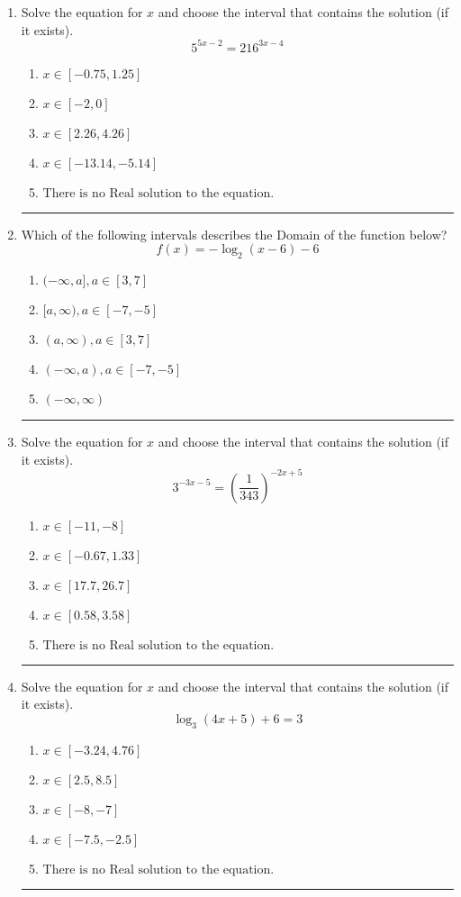 \documentclass[14pt]{extbook}
\newcommand{\litem}[1]{\item#1\hspace*{-1cm}\rule{\textwidth}{0.4pt}}
\begin{document}
\begin{enumerate}
{\begin{enumerate}[label=\Alph*.]
\end{enumerate} }
\litem{
Solve the equation for $x$ and choose the interval that contains the solution (if it exists).\[ 5^{5x-2} = 216^{3x-4} \]\begin{enumerate}[label=\Alph*.]
\item \( x \in [-0.75, 1.25] \)
\item \( x \in [-2, 0] \)
\item \( x \in [2.26, 4.26] \)
\item \( x \in [-13.14, -5.14] \)
\item \( \text{There is no Real solution to the equation.} \)

\end{enumerate} }
\litem{
Which of the following intervals describes the Domain of the function below?\[ f(x) = -\log_2{(x-6)}-6 \]\begin{enumerate}[label=\Alph*.]
\item \( (-\infty, a], a \in [3, 7] \)
\item \( [a, \infty), a \in [-7, -5] \)
\item \( (a, \infty), a \in [3, 7] \)
\item \( (-\infty, a), a \in [-7, -5] \)
\item \( (-\infty, \infty) \)

\end{enumerate} }
\litem{
Solve the equation for $x$ and choose the interval that contains the solution (if it exists).\[ 3^{-3x-5} = \left(\frac{1}{343}\right)^{-2x+5} \]\begin{enumerate}[label=\Alph*.]
\item \( x \in [-11, -8] \)
\item \( x \in [-0.67, 1.33] \)
\item \( x \in [17.7, 26.7] \)
\item \( x \in [0.58, 3.58] \)
\item \( \text{There is no Real solution to the equation.} \)

\end{enumerate} }
\litem{
Solve the equation for $x$ and choose the interval that contains the solution (if it exists).\[ \log_{3}{(4x+5)}+6 = 3 \]\begin{enumerate}[label=\Alph*.]
\item \( x \in [-3.24, 4.76] \)
\item \( x \in [2.5, 8.5] \)
\item \( x \in [-8, -7] \)
\item \( x \in [-7.5, -2.5] \)
\item \( \text{There is no Real solution to the equation.} \)


\end{enumerate}}
\end{enumerate}
\end{document}
